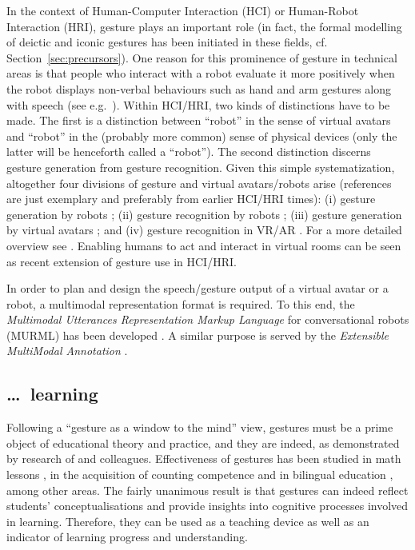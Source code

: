 \documentclass[output=paper
                ,modfonts
                ,nonflat
	        ,collection
	        ,collectionchapter
	        ,collectiontoclongg
 	        ,biblatex
                ,babelshorthands
                ,newtxmath
                ,draftmode
                ,colorlinks, citecolor=brown
]{./langsci/langscibook}
\begin{document}
In the context of Human-Computer Interaction (HCI) or Human-Robot Interaction (HRI), gesture plays an important role (in fact, the formal modelling of deictic and iconic gestures has been initiated in these fields, cf. Section~\ref{sec:precursors}).
%
One reason for this prominence of gesture in technical areas is that people who interact with a robot evaluate it more positively when the robot displays non-verbal behaviours such as hand and arm gestures along with speech (see e.g.\ \citealt{Salem:et:al:2012}).
%
Within HCI/HRI, two kinds of distinctions have to be made. 
%
The first is a distinction between \enquote{robot} in the sense of virtual avatars and \enquote{robot} in the (probably more common) sense of physical devices (only the latter will be henceforth called a \enquote{robot}).
%
The second distinction discerns gesture generation from gesture recognition.
%
Given this simple systematization, altogether four divisions of gesture and virtual avatars/robots arise (references are just exemplary and preferably from earlier HCI/HRI times):
%
(i) gesture generation by robots \citep[e.g.][]{Le:et:al:2011};
%
(ii) gesture recognition by robots \citep[e.g.][]{Triesch:vanDerMalsburg:1998};
%
(iii) gesture generation by virtual avatars \citep[e.g.][]{Cassell:Stone:Yan:2000};
%
and (iv) gesture recognition in VR/AR \citep[e.g.][]{Weissmann:Salomon:1999}.
%
For a more detailed overview see \citet{Luecking:Pfeiffer:2012}.
%
Enabling humans to act and interact in virtual rooms \citep[e.g.][]{Pfeiffer:et:al:2018} can be seen as recent extension of gesture use in HCI/HRI.


In order to plan and design the speech/gesture output of a virtual avatar or a robot, a multimodal representation format is required.
%
To this end, the \textit{Multimodal Utterances Representation Markup Language} for conversational robots (MURML) has been developed \citep{Kranstedt:Kopp:Wachsmuth:2002:b}.
%
A similar purpose is served by the \textit{Extensible MultiModal Annotation} \citep[EMMA;][]{Johnston:2009}.





\subsection{\ldots\ learning}
\label{sec:learning}

Following a \enquote{gesture as a window to the mind} view, gestures must be a prime object of educational theory and practice, and they are indeed, as demonstrated by research of \citet{Cook:Goldin-Meadow:2006} and colleagues.
%
Effectiveness of gestures has been studied in math lessons \citep{Goldin-Meadow:Nusbaum:Kelly:Wagner:2001}, in the acquisition of counting competence \citep{Alibali:DiRusso:1999} and in bilingual education \citep{Breckinridge-Church:Ayman-Nolley:Mahootian:2004}, among other areas.
%
The fairly unanimous result is that gestures can indeed reflect students' conceptualisations and provide insights into cognitive processes involved in learning.
%
Therefore, they can be used as a teaching device as well as an indicator of learning progress and understanding. 
\end{document}
